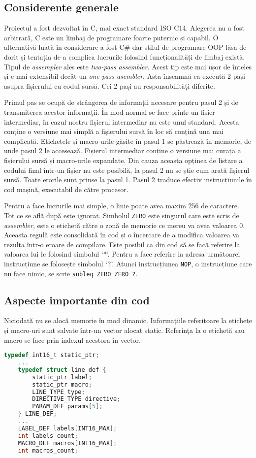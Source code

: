 \documentclass[../main.tex]{subfiles}
\begin{document}
\subsection{Considerente generale}
Proiectul a fost dezvoltat în C, mai exact standard ISO C14. Alegerea nu a fost arbitrară, C este un limbaj de
programare foarte puternic și capabil. O alternativă luată în considerare a fost C\# dar stilul de programare
OOP lăsa de dorit și tentația de a complica lucrurile folosind funcționalități de limbaj există.
Tipul de \emph{assempler} ales este \emph{two-pass assembler}. Acest tip este mai ușor de înteles și e mai extensibil decât un
\emph{one-pass asembler}. Asta înseamnă ca execută 2 pași asupra fișierului cu codul sursă. Cei 2 pași au
responsabilități diferite.

Primul pas se ocupă de strângerea de informații necesare pentru pasul 2 și de
transmiterea acestor informații. În mod normal se face printr-un fișier intermediar, în cazul nostru
fișierul intermediar nu este unul standard. Acesta conține o versiune mai simplă a fișierului sursă
în loc să conțină una mai complicată. Etichetele și macro-urile găsite în pasul 1 se păstrează în 
memorie, de unde pasul 2 le accesează. Fișierul intermediar conține o versiune mai curața a fișierului
sursă și macro-urile expandate. Din cauza aceasta opținea de listare a codului final într-un fișier
nu este posibilă, la pasul 2 nu se știe cum arată fișierul sursă. Toate erorile sunt prinse la pasul 1.
Pasul 2 traduce efectiv instrucțiunile în cod mașină, executabil de către procesor.

Pentru a face lucrurile mai simple, o linie poate avea maxim 256 de caractere.
Tot ce se află după este ignorat. Simbolul \texttt{ZERO} este singurul care este scris de \emph{assembler},
este o etichetă către o zonă de memorie ce mereu va avea valoarea 0. Aceasta regulă este consolidată în cod
și o încercare de a modifica valoarea va rezulta într-o eroare de compilare. Este posibil ca din cod să se
facă referire la valoarea lui \acrshort{lc} folosind simbolul `*'. Pentru a face referire la adresa
următoarei instrucțiune se folosește simbolul `?'. Atunci instrucțiunea \texttt{NOP}, o instrucțiune
care nu face nimic, se scrie \texttt{subleq ZERO ZERO ?}.

\subsection{Aspecte importante din cod}
Niciodată nu se alocă memorie în mod dinamic. Informațiile referitoare la etichete și macro-uri sunt salvate
într-un vector alocat static. Referința la o etichetă sau macro se face prin indexul acestora în vector.
\begin{lstlisting}[caption={Referință prin index în structura LINE\_DEF}, language={C}, label={lst:staticptr}]
    typedef int16_t static_ptr;
    ...
    typedef struct line_def {
	    static_ptr label;
	    static_ptr macro;
	    LINE_TYPE type;
	    DIRECTIVE_TYPE directive;
	    PARAM_DEF params[5];
    } LINE_DEF;
    ...
    LABEL_DEF labels[INT16_MAX];
    int labels_count;
    MACRO_DEF macros[INT16_MAX];
    int macros_count;
\end{lstlisting}
\end{document}
